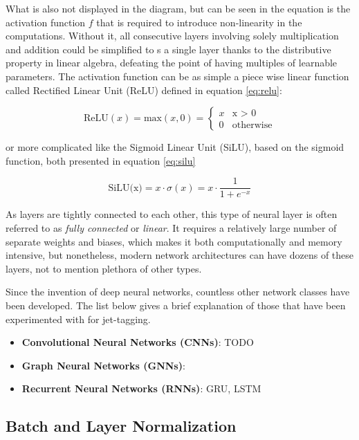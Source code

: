 What is also not displayed in the diagram, but can be seen in the equation is the activation function \(f\) that is required to introduce non-linearity in the computations. Without it, all consecutive layers involving solely multiplication and addition could be simplified to s a single layer thanks to the distributive property in linear algebra, defeating the point of having multiples of learnable parameters. The activation function can be as simple a piece wise linear function called Rectified Linear Unit (ReLU) defined in equation \ref{eq:relu}:

\begin{equation}\label{eq:relu}
  \text{ReLU}(x) = \text{max}(x, 0) = 
  \begin{cases}
    x & \text{x > 0} \\
    0 & \text{otherwise}
  \end{cases}
\end{equation}

or more complicated like the Sigmoid Linear Unit (SiLU), based on the sigmoid function, both presented in equation \ref{eq:silu}

\begin{equation}\label{eq:silu}
  \text{SiLU(x)} = x \cdot \sigma (x) = x \cdot \frac{1}{1 + e^{-x}}
\end{equation}

As layers are tightly connected to each other, this type of neural layer is often referred to as \textit{fully connected} or \textit{linear}. It requires a relatively large number of separate weights and biases, which makes it both computationally and memory intensive, but nonetheless, modern network architectures can have dozens of these layers, not to mention plethora of other types.

Since the invention of deep neural networks, countless other network classes have been developed. The list below gives a brief explanation of those that have been experimented with for jet-tagging.

\begin{itemize}
  \item \textbf{Convolutional Neural Networks (CNNs)}: TODO
  \item \textbf{Graph Neural Networks (GNNs)}: 
  \item \textbf{Recurrent Neural Networks (RNNs)}: GRU, LSTM
\end{itemize}

\subsection{Batch and Layer Normalization}
\indo{|}
\indo{|}
\indo{|}
\indo{|}
\indo{|}



